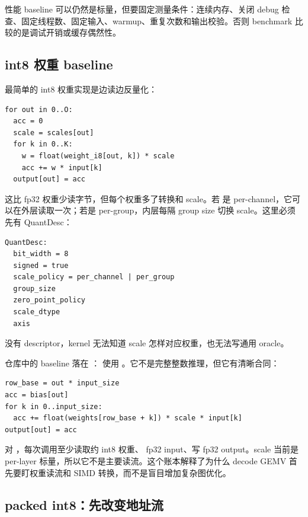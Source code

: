 性能 baseline 可以仍然是标量，但要固定测量条件：连续内存、关闭 debug 检查、固定线程数、固定输入、warmup、重复次数和输出校验。否则 benchmark 比较的是调试开销或缓存偶然性。

\subsection{int8 权重 baseline}

最简单的 int8 权重实现是边读边反量化：

\begin{lstlisting}[numbers=none,caption={int8 权重 + fp32 输入 baseline}]
for out in 0..O:
  acc = 0
  scale = scales[out]
  for k in 0..K:
    w = float(weight_i8[out, k]) * scale
    acc += w * input[k]
  output[out] = acc
\end{lstlisting}

这比 fp32 权重少读字节，但每个权重多了转换和 scale。若  是 per-channel，它可以在外层读取一次；若是 per-group，内层每隔 group size 切换 scale。这里必须先有 QuantDesc：

\begin{lstlisting}[numbers=none,caption={int8 QuantDesc 最小字段}]
QuantDesc:
  bit_width = 8
  signed = true
  scale_policy = per_channel | per_group
  group_size
  zero_point_policy
  scale_dtype
  axis
\end{lstlisting}

没有 descriptor，kernel 无法知道 scale 怎样对应权重，也无法写通用 oracle。

仓库中的 baseline 落在 ： 使用 。它不是完整整数推理，但它有清晰合同：

\begin{lstlisting}[numbers=none,caption={lcqi 当前 int8 scalar 语义}]
row_base = out * input_size
acc = bias[out]
for k in 0..input_size:
  acc += float(weights[row_base + k]) * scale * input[k]
output[out] = acc
\end{lstlisting}

对 ，每次调用至少读取约  int8 权重、 fp32 input、写  fp32 output。scale 当前是 per-layer 标量，所以它不是主要读流。这个账本解释了为什么 decode GEMV 首先要盯权重读流和 SIMD 转换，而不是盲目增加复杂图优化。

\subsection{packed int8：先改变地址流}

